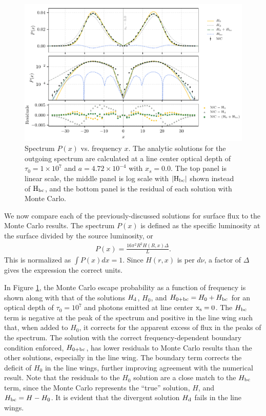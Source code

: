 \documentclass{aastex63}
\newcommand{\be}{\begin{eqnarray}}
\newcommand{\ee}{\end{eqnarray}}
\begin{document}
\begin{figure}
    \centering
    \includegraphics{final_residual.pdf}
    \caption{Spectrum $P(x)$ vs. frequency $x$. The analytic solutions for the outgoing spectrum are calculated at a line center optical depth of $\tau_0 = 1 \times 10^7$ and $a = 4.72\times 10^{-4}$ with $x_s = 0.0$. The top panel is linear scale, the middle panel is log scale with $|\rm H_{bc}|$ shown instead of $\rm H_{bc}$, and the bottom panel is the residual of each solution with Monte Carlo.} 
    \label{fig:sol_mc_residual_0}
\end{figure}

We now compare each of the previously-discussed solutions for surface flux to the Monte Carlo results. The spectrum $P(x)$ is defined as the specific luminosity at the surface divided by the source luminosity, or
\be \label{eq:prob_spectrum}
P(x) = \frac{16\pi^2R^2H(R, x)\Delta}{L}.
\ee
This is normalized as $\int P(x)dx = 1$. Since $H(r, x)$ is per $d\nu$, a factor of $\Delta$ gives the expression the correct units. 

In Figure \ref{fig:sol_mc_residual_0}, the Monte Carlo escape probability as a function of frequency is shown along with that of the solutions $H_{\rm d}$, $H_0$, and $H_{\rm 0 + bc} = H_0 + H_{\rm bc}$ for an optical depth of $\tau_0 = 10^7$ and photons emitted at line center $\rm x_s = 0$.  The $H_{\rm bc}$ term is negative at the peak of the spectrum and positive in the line wing such that, when added to $H_0$, it corrects for the apparent excess of flux in the peaks of the spectrum. The solution with the correct frequency-dependent boundary condition enforced, $H_{0 + \rm bc}$, has lower residuals to Monte Carlo results than the other solutions, especially in the line wing. The boundary term corrects the deficit of $H_0$ in the line wings, further improving agreement with the numerical result. Note that the residuals to the $H_0$ solution are a close match to the $H_{\rm bc}$ term, since the Monte Carlo represents the ``true'' solution, $H$, and $H_{\rm bc} = H - H_0$. It is evident that the divergent solution $H_{\rm d}$ fails in the line wings.
\end{document}
